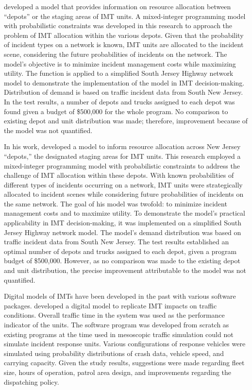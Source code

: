 \documentclass[
  letterpaper,
  authoryear]{elsarticle}
\begin{document}
\citet{ozbay2013} developed a model that provides information on
resource allocation between ``depots'' or the staging areas of IMT
units. A mixed-integer programming model with probabilistic constraints
was developed in this research to approach the problem of IMT allocation
within the various depots. Given that the probability of incident types
on a network is known, IMT units are allocated to the incident scene,
considering the future probabilities of incidents on the network. The
model's objective is to minimize incident management costs while
maximizing utility. The function is applied to a simplified South Jersey
Highway network model to demonstrate the implementation of the model in
IMT decision-making. Distribution of demand is based on traffic incident
data from South New Jersey. In the test results, a number of depots and
trucks assigned to each depot was found given a budget of \$500,000 for
the whole program. No comparison to existing depot and unit distribution
was made; therefore, improvement because of the model was not
quantified.

In his work, \citet{ozbay2013} developed a model to inform resource
allocation across New Jersey ``depots,'' the designated staging areas
for IMT units. This research employed a mixed-integer programming model
with probabilistic constraints to address the challenge of IMT
allocation within these depots. With known probabilities of different
types of incidents occurring on a network, IMT units were strategically
allocated to incident scenes while considering future probabilities of
incidents on the same network. The goal of his model was twofold: to
minimize incident management costs and to maximize utility. To
demonstrate the model's practical applicability in IMT decision-making,
it was implemented on a simplified South Jersey Highway network model.
The model's demand distribution was based on traffic incident data from
South New Jersey. The test results established an optimal number of
depots and trucks assigned to each depot, given a program budget of
\$500,000. However, as no comparison was made to the existing depot and
unit distribution, the precise improvement attributable to the model was
not quantified.

Digital models of IMTs have been developed in the past with various
software packages. \citet{pal2002} developed a digital model to
replicate IMT impacts on traffic conditions. Overall traffic time in the
system was used as the performance indicator of the units. The software
program was developed from scratch as existing programs at the time used
in mesoscopic traffic simulation could not simulate incident response
units. Various configurations of response vehicles were simulated using
probability distributions of crash data, vehicle speed, and carrying
capacity. Given the study results, suggestions were made regarding fleet
size, hours of operation, patrol area design, and improvements regarding
the dispatching policy.
\end{document}
